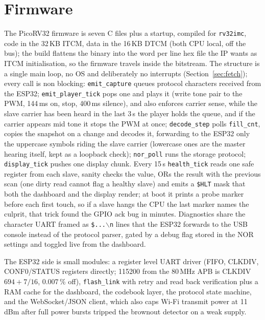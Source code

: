 \documentclass[a4paper,10pt]{article}
\begin{document}
\section{Firmware}
\label{sec:firmware}

The PicoRV32 firmware is seven C files plus a startup, compiled for
\texttt{rv32imc}, code in the 32\,KB ITCM, data in the 16\,KB DTCM (both CPU local,
off the bus); the build flattens the binary into the word per line hex file the IP
wants as ITCM initialisation, so the firmware travels inside the bitstream. The
structure is a single main loop, no OS and deliberately no interrupts
(Section~\ref{sec:fetch}); every call is non blocking: \texttt{emit\_capture} queues
protocol characters received from the ESP32; \texttt{emit\_player\_tick} pops one
and plays it (write tone pair to the PWM, 144\,ms on, stop, 400\,ms silence), and
also enforces carrier sense, while the slave carrier has been heard in the last
3\,s the player holds the queue, and if the carrier appears mid tone it stops the
PWM at once; \texttt{decode\_step} polls \texttt{fill\_cnt}, copies the snapshot on
a change and decodes it, forwarding to the ESP32 only the uppercase symbols riding
the slave carrier (lowercase ones are the master hearing itself, kept as a loopback
check); \texttt{nor\_poll} runs the storage protocol; \texttt{display\_tick} pushes
one display chunk. Every 15\,s \texttt{health\_tick} reads one safe register from each
slave, sanity checks the value, ORs the result with the previous scan (one dirty
read cannot flag a healthy slave) and emits a \texttt{\$HLT} mask that both the
dashboard and the display render; at boot it prints a probe marker before each first
touch, so if a slave hangs the CPU the last marker names the culprit, that trick
found the GPIO ack bug in minutes. Diagnostics share the character UART framed as
\texttt{\$...}$\backslash$\texttt{n} lines that the ESP32 forwards to the USB
console instead of the protocol parser, gated by a debug flag stored in the NOR
settings and toggled live from the dashboard.

The ESP32 side is small modules: a register level UART driver (FIFO, CLKDIV,
CONF0/STATUS registers directly; 115200 from the 80\,MHz APB is CLKDIV
$694+7/16$, $0.007$\,\% off), \texttt{flash\_link} with retry and read back
verification plus a RAM cache for the dashboard, the codebook layer, the protocol
state machine, and the WebSocket/JSON client, which also caps Wi-Fi transmit power
at 11\,dBm after full power bursts tripped the brownout detector on a weak supply.
\end{document}
